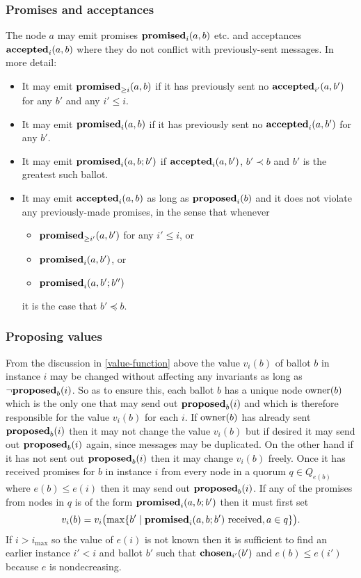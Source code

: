 \documentclass[journal]{IEEEtran}
\begin{document}
\subsubsection{Promises and acceptances} The node $a$ may emit promises
$\mathbf{promised}_{i}(a,b)$ etc. and acceptances $\mathbf{accepted}_{i}(a,b)$ where they do not
conflict with previously-sent messages. In more detail: \begin{itemize} \item
It may emit $\mathbf{promised}_{\ge i}(a,b)$ if it has previously sent no $\mathbf{accepted}_{i'}(a,b')$
for any $b'$ and any $i' \le i$. \item It may emit $\mathbf{promised}_{i}(a,b)$ if it has
previously sent no $\mathbf{accepted}_{i}(a,b')$ for any $b'$. \item It may emit
$\mathbf{promised}_{i}(a,b;b')$ if $\mathbf{accepted}_{i}(a,b')$, $b' \prec b$ and $b'$ is the
greatest such ballot. \item It may emit $\mathbf{accepted}_{i}(a,b)$ as long as
$\mathbf{proposed}_{i}(b)$ and it does not violate any previously-made promises, in the
sense that whenever \begin{itemize} \item $\mathbf{promised}_{\ge i'}(a,b')$ for any $i' \le
i$, or \item $\mathbf{promised}_{i}(a,b')$, or \item $\mathbf{promised}_{i}(a,b';b'')$\end{itemize}
it is the case that $b' \preceq b$. \end{itemize}

\subsubsection{Proposing values} From the discussion in \ref{value-function}
above the value $v_i(b)$ of ballot $b$ in instance $i$ may be changed without
affecting any invariants as long as $\neg\mathbf{proposed}_{b}(i)$. So as to ensure this,
each ballot $b$ has a unique node $\mathrm{owner}(b)$ which is the only one that may
send out $\mathbf{proposed}_{b}(i)$ and which is therefore responsible for the value
$v_i(b)$ for each $i$. If $\mathrm{owner}(b)$ has already sent $\mathbf{proposed}_{b}(i)$ then it
may not change the value $v_i(b)$ but if desired it may send out $\mathbf{proposed}_{b}(i)$
again, since messages may be duplicated. On the other hand if it has not sent
out $\mathbf{proposed}_{b}(i)$ then it may change $v_i(b)$ freely. Once it has received
promises for $b$ in instance $i$ from every node in a quorum $q \in Q_{e(b)}$
where $e(b) \le e(i)$ then it may send out $\mathbf{proposed}_{b}(i)$. If any of the
promises from nodes in $q$ is of the form $\mathbf{promised}_{i}(a,b;b')$ then it must
first set \[v_i(b) = v_i\bigl(\mathrm{max} \{b' \mid \mathbf{promised}_{i}(a,b;b')
\textrm{ received}, a \in q \}\bigr).\] If $i > i_\mathrm{max}$ so the value of
$e(i)$ is not known then it is sufficient to find an earlier instance $i' < i$
and ballot $b'$ such that $\mathbf{chosen}_{i'}(b')$ and $e(b) \le e(i')$ because $e$
is nondecreasing.
\end{document}
